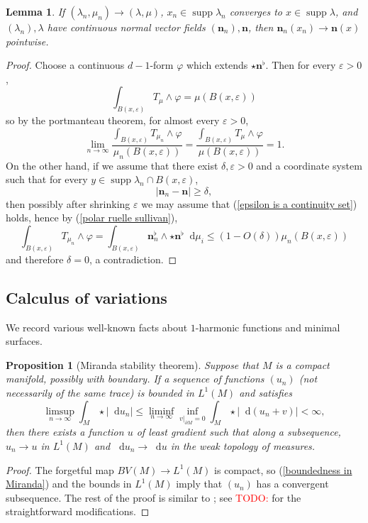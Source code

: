 \documentclass[reqno,11pt]{amsart}
\newcommand*\dif{\mathop{}\!\mathrm{d}}
\DeclareMathOperator{\supp}{supp}
\newcommand{\normal}{\mathbf n}
\newtheorem{lemma}[theorem]{Lemma}
\newtheorem{proposition}[theorem]{Proposition}
\theoremstyle{definition}
\numberwithin{equation}{section}
\newcommand\todo[1]{\textcolor{red}{TODO: #1}}
\begin{document}
\begin{lemma}\label{convergence of normals}
If $(\lambda_n, \mu_n) \to (\lambda, \mu)$, $x_n \in \supp \lambda_n$ converges to $x \in \supp \lambda$, and $(\lambda_n), \lambda$ have continuous normal vector fields $(\normal_n), \normal$, then $\normal_n(x_n) \to \normal(x)$ pointwise.
\end{lemma}
\begin{proof}
	Choose a continuous $d-1$-form $\varphi$ which extends $\star \normal^\flat$.
	Then for every $\varepsilon > 0$,
	$$\int_{B(x, \varepsilon)} T_\mu \wedge \varphi = \mu(B(x, \varepsilon))$$
	so by the portmanteau theorem, for almost every $\varepsilon > 0$,
	\begin{equation}\label{epsilon is a continuity set}
		\lim_{n \to \infty} \frac{\int_{B(x, \varepsilon)} T_{\mu_n} \wedge \varphi}{\mu_n(B(x, \varepsilon))} = \frac{\int_{B(x, \varepsilon)} T_\mu \wedge \varphi}{\mu(B(x, \varepsilon))} = 1.
	\end{equation}
	On the other hand, if we assume that there exist $\delta, \varepsilon > 0$ and a coordinate system such that for every $y \in \supp \lambda_n \cap B(x, \varepsilon)$,
	$$|\normal_n - \normal| \geq \delta,$$
	then possibly after shrinking $\varepsilon$ we may assume that (\ref{epsilon is a continuity set}) holds, hence by (\ref{polar ruelle sullivan}),
	$$\int_{B(x, \varepsilon)} T_{\mu_n} \wedge \varphi = \int_{B(x, \varepsilon)} \normal_n^\flat \wedge \star \normal^\flat \dif \mu_i \leq (1 - O(\delta)) \mu_n(B(x, \varepsilon))$$
	and therefore $\delta = 0$, a contradiction.
\end{proof}


\subsection{Calculus of variations}
We record various well-known facts about $1$-harmonic functions and minimal surfaces.

\begin{proposition}[Miranda stability theorem]
  Suppose that $M$ is a compact manifold, possibly with boundary.
	If a sequence of functions $(u_n)$ (not necessarily of the same trace) is bounded in $L^1(M)$ and satisfies
\begin{equation}\label{boundedness in Miranda}
	\limsup_{n \to \infty} \int_M \star |\dif u_n| \leq \liminf_{n \to \infty} \inf_{v|_{\partial M} = 0} \int_M \star |\dif(u_n + v)| < \infty,
\end{equation}
	then there exists a function $u$ of least gradient such that along a subsequence, $u_n \to u$ in $L^1(M)$ and $\dif u_n \to \dif u$ in the weak topology of measures.
\end{proposition}
\begin{proof}
The forgetful map $BV(M) \to L^1(M)$ is compact, so (\ref{boundedness in Miranda}) and the bounds in $L^1(M)$ imply that $(u_n)$ has a convergent subsequence.
The rest of the proof is similar to \cite[Teorema 3 and Osservazione 3]{Miranda67}; see \todo{\cite{BackusFLG}} for the straightforward modifications.
\end{proof}
\end{document}
